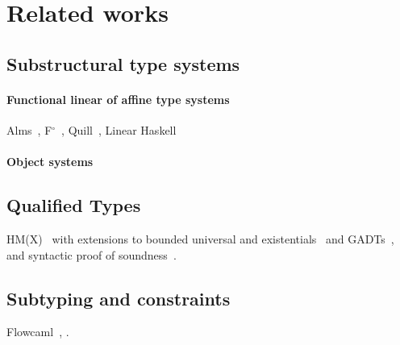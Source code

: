 \section{Related works}

\subsection{Substructural type systems}

\paragraph{Functional linear of affine type systems}

Alms~\citep{DBLP:conf/popl/TovP11},
F$^\circ$~\citep{DBLP:conf/tldi/MazurakZZ10},
Quill~\citep{DBLP:conf/icfp/Morris16},
Linear Haskell~\citep{DBLP:journals/pacmpl/BernardyBNJS18}

\paragraph{Object systems}
\TODO{}

\subsection{Qualified Types}

HM(X)~\citep{DBLP:journals/tapos/OderskySW99} with extensions to
bounded universal and existentials~\citep{DBLP:conf/icfp/Simonet03}
and GADTs~\citep{DBLP:journals/toplas/SimonetP07},
and syntactic proof of soundness~\citep{DBLP:journals/entcs/SkalkaP02}.

\subsection{Subtyping and constraints}

Flowcaml~\citep{DBLP:conf/popl/PottierS02},
\citet{DBLP:conf/sas/TrifonovS96}.



